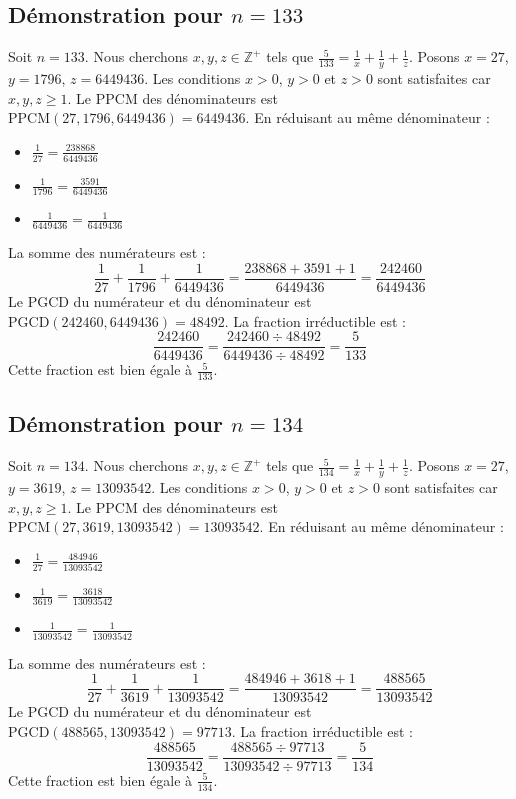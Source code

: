 \documentclass[11pt,a4paper]{article}
\begin{document}
\subsection{Démonstration pour $n = 133$}
Soit $n = 133$. Nous cherchons $x, y, z \in \mathbb{Z}^{+}$ tels que $\frac{5}{133} = \frac{1}{x} + \frac{1}{y} + \frac{1}{z}$.
Posons $x = 27$, $y = 1796$, $z = 6449436$.
Les conditions $x > 0$, $y > 0$ et $z > 0$ sont satisfaites car $x, y, z \geq 1$.
Le PPCM des dénominateurs est $\text{PPCM}(27, 1796, 6449436) = 6449436$.
En réduisant au même dénominateur :
\begin{itemize}
    \item $\frac{1}{27} = \frac{238868}{6449436}$
    \item $\frac{1}{1796} = \frac{3591}{6449436}$
    \item $\frac{1}{6449436} = \frac{1}{6449436}$
\end{itemize}
La somme des numérateurs est :
$$ \frac{1}{27} + \frac{1}{1796} + \frac{1}{6449436} = \frac{238868 + 3591 + 1}{6449436} = \frac{242460}{6449436} $$
Le PGCD du numérateur et du dénominateur est $\text{PGCD}(242460, 6449436) = 48492$.
La fraction irréductible est :
$$ \frac{242460}{6449436} = \frac{242460 \div 48492}{6449436 \div 48492} = \frac{5}{133} $$
Cette fraction est bien égale à $\frac{5}{133}$.

\subsection{Démonstration pour $n = 134$}
Soit $n = 134$. Nous cherchons $x, y, z \in \mathbb{Z}^{+}$ tels que $\frac{5}{134} = \frac{1}{x} + \frac{1}{y} + \frac{1}{z}$.
Posons $x = 27$, $y = 3619$, $z = 13093542$.
Les conditions $x > 0$, $y > 0$ et $z > 0$ sont satisfaites car $x, y, z \geq 1$.
Le PPCM des dénominateurs est $\text{PPCM}(27, 3619, 13093542) = 13093542$.
En réduisant au même dénominateur :
\begin{itemize}
    \item $\frac{1}{27} = \frac{484946}{13093542}$
    \item $\frac{1}{3619} = \frac{3618}{13093542}$
    \item $\frac{1}{13093542} = \frac{1}{13093542}$
\end{itemize}
La somme des numérateurs est :
$$ \frac{1}{27} + \frac{1}{3619} + \frac{1}{13093542} = \frac{484946 + 3618 + 1}{13093542} = \frac{488565}{13093542} $$
Le PGCD du numérateur et du dénominateur est $\text{PGCD}(488565, 13093542) = 97713$.
La fraction irréductible est :
$$ \frac{488565}{13093542} = \frac{488565 \div 97713}{13093542 \div 97713} = \frac{5}{134} $$
Cette fraction est bien égale à $\frac{5}{134}$.
\end{document}
